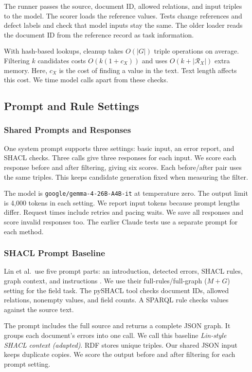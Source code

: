 The runner passes the source, document ID, allowed relations, and input triples
to the model.
The scorer loads the reference values.
Tests change references and defect labels and check that model inputs stay the same.
The older loader reads the document ID from the reference record as task information.

With hash-based lookups, cleanup takes $O(|G|)$ triple operations on average.
Filtering $k$ candidates costs $O(k(1+c_X))$ and uses
$O(k+|\mathcal R_X|)$ extra memory.
Here, $c_X$ is the cost of finding a value in the text.
Text length affects this cost.
We time model calls apart from these checks.

\subsection{Prompt and Rule Settings}
\label{sec:impl:enhancement}

\subsubsection{Shared Prompts and Responses}

One system prompt supports three settings: basic input, an error report,
and SHACL checks.
Three calls give three responses for each input.
We score each response before and after filtering, giving six scores.
Each before/after pair uses the same triples.
This keeps candidate generation fixed when measuring the filter.

The model is \texttt{google/gemma-4-26B-A4B-it} at temperature zero.
The output limit is 4,000 tokens in each setting.
We report input tokens because prompt lengths differ.
Request times include retries and pacing waits.
We save all responses and score invalid responses too.
The earlier Claude tests use a separate prompt for each method.

\subsubsection{SHACL Prompt Baseline}
\label{sec:impl:shacl}

Lin et al.\ use five prompt parts: an introduction, detected errors,
SHACL rules, graph context, and instructions \citep{ref_lin2025}.
We use their full-rules/full-graph ($M+G$) setting for the field task.
The pySHACL tool checks document IDs, allowed relations, nonempty values,
and field counts.
A SPARQL rule checks values against the source text.

The prompt includes the full source and returns a complete JSON graph.
It groups each document's errors into one call.
We call this baseline \emph{Lin-style SHACL context (adapted)}.
RDF stores unique triples.
Our shared JSON input keeps duplicate copies.
We score the output before and after filtering for each prompt setting.

